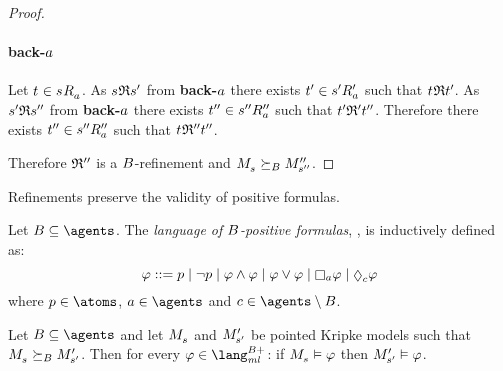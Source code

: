 \begin{proof}
    \paragraph{back-$a$}
    Let $\kStateT \in \kSuccessorsA{\kStateS}$.
    As $\kStateS \refinement \kStateSP$ from {\bf back-$a$} there exists ${{t}^{\prime}} \in {{{s}^{\prime}}} {R^{\prime}_{a}}$ such that $\kStateT \refinement \kStateTP$.
    As ${{s}^{\prime}} \mathfrak{R} {{s}^{\prime\prime}}$ from {\bf back-$a$} there exists ${{t}^{\prime\prime}} \in {{{s}^{\prime\prime}}} {R^{\prime\prime}_{a}}$ such that ${{t}^{\prime}} \mathfrak{R}' {{t}^{\prime\prime}}$.
    Therefore there exists ${{t}^{\prime\prime}} \in {{{s}^{\prime\prime}}} {R^{\prime\prime}_{a}}$ such that $\kStateT \refinement'' \kStateTPP$.

    Therefore $\mathfrak{R}''$ is a $B$-refinement and $\kPModel{\kStateS} \simulatesBs \kPModelPP{\kStateSPP}$. 
\end{proof}

Refinements preserve the validity of positive formulas.

\begin{definition}
Let $\agentsB \subseteq \agents$.
The {\em language of $B$-positive formulas}, \langMlPlusBs{}, is inductively defined as:
$$
\phi ::= 
    \atomP \mid
    \lnot \atomP \mid
    \phi \land \phi \mid
    \phi \lor \phi \mid
    \necessaryA \phi \mid
    \possibleC \phi
$$
where $\atomP \in \atoms$, $\agentA \in \agents$ and $\agentC \in \agents \setminus \agentsB$.
\end{definition}

\begin{proposition}
Let $\agentsB \subseteq \agents$ and let $\kPModel{\kStateS}$ and ${M^{\prime}_{{{s}^{\prime}}}}$ be pointed Kripke models such that $\kPModel{\kStateS} \simulatesBs \kPModelP{\kStateSP}$.
Then for every $\phi \in \langMlPlusBs$:
if $\kPModel{\kStateS} \entails \phi$ then ${M^{\prime}_{{{s}^{\prime}}}} \vDash \varphi$.
\end{proposition}

